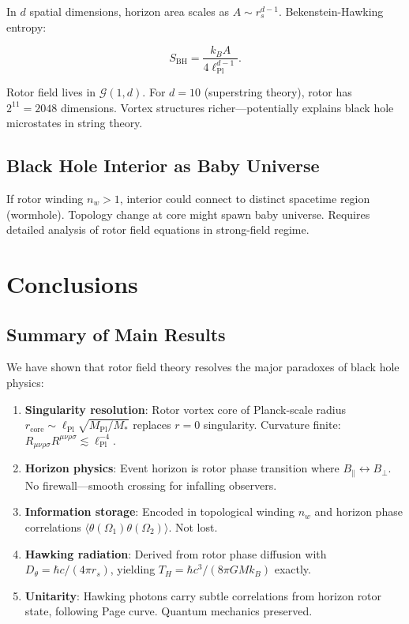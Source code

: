 \documentclass[11pt,a4paper]{article}
\numberwithin{equation}{section}
\theoremstyle{plain}
\theoremstyle{definition}
\theoremstyle{remark}
\newcommand{\Cl}{\mathcal{G}}               %
\begin{document}
In $d$ spatial dimensions, horizon area scales as $A \sim r_s^{d-1}$. Bekenstein-Hawking entropy:

\begin{equation}
S_{\text{BH}} = \frac{k_B A}{4\ell_{\text{Pl}}^{d-1}}.
\end{equation}

Rotor field lives in $\Cl(1,d)$. For $d=10$ (superstring theory), rotor has $2^{11} = 2048$ dimensions. Vortex structures richer—potentially explains black hole microstates in string theory.

\subsection{Black Hole Interior as Baby Universe}

If rotor winding $n_w > 1$, interior could connect to distinct spacetime region (wormhole). Topology change at core might spawn baby universe. Requires detailed analysis of rotor field equations in strong-field regime.

\section{Conclusions}
\label{sec:conclusions}

\subsection{Summary of Main Results}

We have shown that rotor field theory resolves the major paradoxes of black hole physics:

\begin{enumerate}
\item \textbf{Singularity resolution}: Rotor vortex core of Planck-scale radius $r_{\text{core}} \sim \ell_{\text{Pl}}\sqrt{M_{\text{Pl}}/M_*}$ replaces $r=0$ singularity. Curvature finite: $R_{\mu\nu\rho\sigma}R^{\mu\nu\rho\sigma} \lesssim \ell_{\text{Pl}}^{-4}$.

\item \textbf{Horizon physics}: Event horizon is rotor phase transition where $B_\parallel \leftrightarrow B_\perp$. No firewall—smooth crossing for infalling observers.

\item \textbf{Information storage}: Encoded in topological winding $n_w$ and horizon phase correlations $\langle\theta(\Omega_1)\theta(\Omega_2)\rangle$. Not lost.

\item \textbf{Hawking radiation}: Derived from rotor phase diffusion with $D_\theta = \hbar c/(4\pi r_s)$, yielding $T_H = \hbar c^3/(8\pi GMk_B)$ exactly.

\item \textbf{Unitarity}: Hawking photons carry subtle correlations from horizon rotor state, following Page curve. Quantum mechanics preserved.
\end{enumerate}
\end{document}
